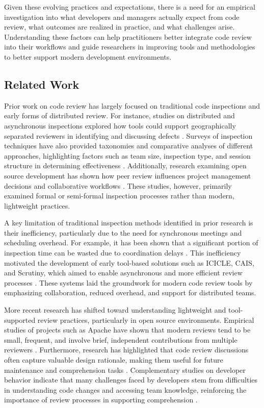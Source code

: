 Given these evolving practices and expectations, there is a need for an empirical investigation into what developers and managers actually expect from code review, what outcomes are realized in practice, and what challenges arise. Understanding these factors can help practitioners better integrate code review into their workflows and guide researchers in improving tools and methodologies to better support modern development environments.

\subsection{Related Work}
Prior work on code review has largely focused on traditional code inspections and early forms of distributed review. For instance, studies on distributed and asynchronous inspections explored how tools could support geographically separated reviewers in identifying and discussing defects \cite{stein1997distributed}. Surveys of inspection techniques have also provided taxonomies and comparative analyses of different approaches, highlighting factors such as team size, inspection type, and session structure in determining effectiveness \cite{laitenberger2002survey,porter1996review}. Additionally, research examining open source development has shown how peer review influences project management decisions and collaborative workflows \cite{johnson2006collaboration}. These studies, however, primarily examined formal or semi-formal inspection processes rather than modern, lightweight practices.

A key limitation of traditional inspection methods identified in prior research is their inefficiency, particularly due to the need for synchronous meetings and scheduling overhead. For example, it has been shown that a significant portion of inspection time can be wasted due to coordination delays \cite{votta1993does}. This inefficiency motivated the development of early tool-based solutions such as ICICLE, CAIS, and Scrutiny, which aimed to enable asynchronous and more efficient review processes \cite{brothers1990icicle,mashayekhi1994cais,gintell1993scrutiny}. These systems laid the groundwork for modern code review tools by emphasizing collaboration, reduced overhead, and support for distributed teams.

More recent research has shifted toward understanding lightweight and tool-supported review practices, particularly in open source environments. Empirical studies of projects such as Apache have shown that modern reviews tend to be small, frequent, and involve brief, independent contributions from multiple reviewers \cite{rigby2008open}. Furthermore, research has highlighted that code review discussions often capture valuable design rationale, making them useful for future maintenance and comprehension tasks \cite{sutherland2009can}. Complementary studies on developer behavior indicate that many challenges faced by developers stem from difficulties in understanding code changes and accessing team knowledge, reinforcing the importance of review processes in supporting comprehension \cite{latoza2006maintaining}.

